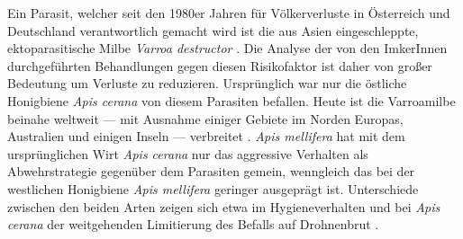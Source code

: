 Ein Parasit, welcher seit den 1980er Jahren für Völkerverluste in Österreich und Deutschland verantwortlich gemacht wird ist die aus Asien eingeschleppte, ektoparasitische Milbe \textit{Varroa destructor} \citep{rosenkranz2010, genersch2010, morawetz2019}. Die Analyse der von den ImkerInnen durchgeführten Behandlungen gegen diesen Risikofaktor ist daher von großer Bedeutung um Verluste zu reduzieren. Ursprünglich war nur die östliche Honigbiene \textit{Apis cerana} von diesem Parasiten befallen. Heute ist die Varroamilbe beinahe weltweit --- mit Ausnahme einiger Gebiete im Norden Europas, Australien und einigen Inseln --- verbreitet \citep{dahle2010,brodschneider2011}. \textit{Apis mellifera} hat mit dem ursprünglichen Wirt \textit{Apis cerana} nur das aggressive Verhalten als Abwehrstrategie gegenüber dem Parasiten gemein, wenngleich das bei der westlichen Honigbiene \textit{Apis mellifera} geringer ausgeprägt ist. Unterschiede zwischen den beiden Arten zeigen sich etwa im Hygieneverhalten und bei \textit{Apis cerana} der weitgehenden Limitierung des Befalls auf Drohnenbrut \citep{rosenkranz2010}.
\newline
